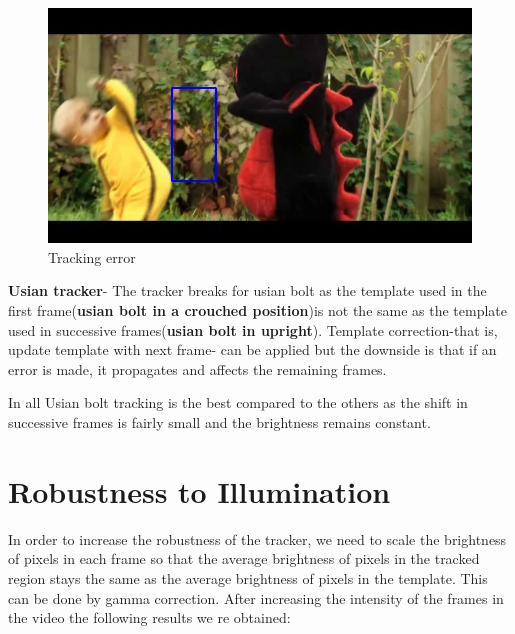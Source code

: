 \documentclass[12pt]{article}
\begin{document}
\begin{figure}[h]
    \centering
    \includegraphics[width=12cm]{trackbaby5}
    \caption{Tracking error}
    \label{fig:Tracking error}
\end{figure}

\textbf{Usian tracker}-
The tracker breaks for usian bolt as the template used in the first frame(\textbf{usian bolt in a crouched position})is not the same as the template used in successive frames(\textbf{usian bolt in upright}). Template correction-that is, update template with next frame- can be applied but the downside is that if an error is made, it propagates and affects the remaining frames.

In all Usian bolt tracking is the best compared to the others as the shift in successive frames is fairly small and the brightness remains constant.

\section{Robustness to Illumination}
In order to increase the robustness of the tracker, we need to scale the brightness of pixels in each frame so that the average brightness of pixels in the tracked region stays the same as the average brightness of pixels in the template. This can be done by gamma correction.
After increasing the intensity of the frames in the video the following results we re obtained:\\
\end{document}
